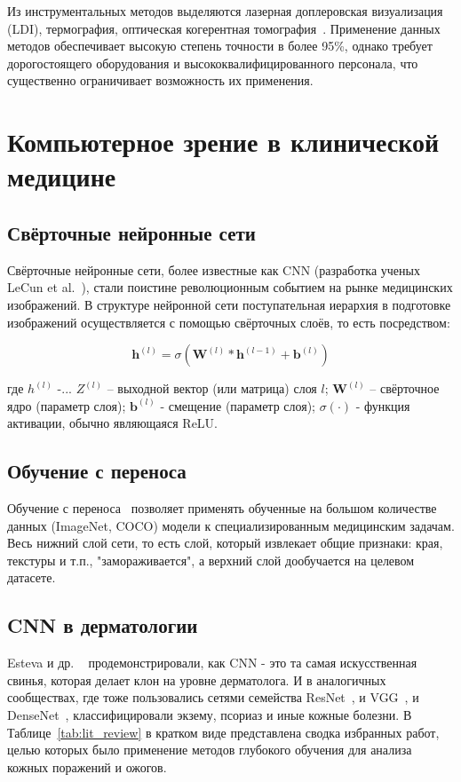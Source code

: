 Из инструментальных методов выделяются лазерная доплеровская визуализация (LDI), термография, оптическая когерентная томография~\cite{hoeksema2009accuracy}. Применение данных методов обеспечивает высокую степень точности в более 95\%, однако требует дорогостоящего оборудования и высококвалифицированного персонала, что существенно ограничивает возможность их применения. \section{Компьютерное зрение в клинической медицине}

\subsection{Свёрточные нейронные сети}

Свёрточные нейронные сети, более известные как CNN (разработка ученых LeCun et al.~\cite{lecun1998cnn}), стали поистине революционным событием на рынке медицинских изображений. В структуре нейронной сети поступательная иерархия в подготовке изображений осуществляется с помощью свёрточных слоёв, то есть посредством:

\begin{equation}
\mathbf{h}^{(l)} = \sigma\left(\mathbf{W}^{(l)} * \mathbf{h}^{(l-1)} + \mathbf{b}^{(l)}\right)
\label{eq:cnn}
\end{equation}

\noindent где $h^{(l)}$ -... $Z^{(l)}$ -- выходной вектор (или матрица) слоя $l$; $\mathbf{W}^{(l)}$ -- свёрточное ядро (параметр слоя); $\mathbf{b}^{(l)}$ - смещение (параметр слоя); $\sigma(\cdot)$ - функция активации, обычно являющаяся ReLU. \subsection{Обучение с переноса}

Обучение с переноса~\cite{yosinski2014transfer} позволяет применять обученные на большом количестве данных (ImageNet, COCO) модели к специализированным медицинским задачам. Весь нижний слой сети, то есть слой, который извлекает общие признаки: края, текстуры и т.п., "замораживается", а верхний слой дообучается на целевом датасете.

\subsection{CNN в дерматологии}

Esteva и др. ~\cite{esteva2017dermatologist} продемонстрировали, как CNN - это та самая искусственная свинья, которая делает клон на уровне дерматолога. И в аналогичных сообществах, где тоже пользовались сетями семейства ResNet~\cite{he2016resnet}, и VGG~\cite{simonyan2014vgg}, и DenseNet~\cite{huang2017densenet}, классифицировали экзему, псориаз и иные кожные болезни. В Таблице~\ref{tab:lit_review} в кратком виде представлена сводка избранных работ, целью которых было применение методов глубокого обучения для анализа кожных поражений и ожогов.

